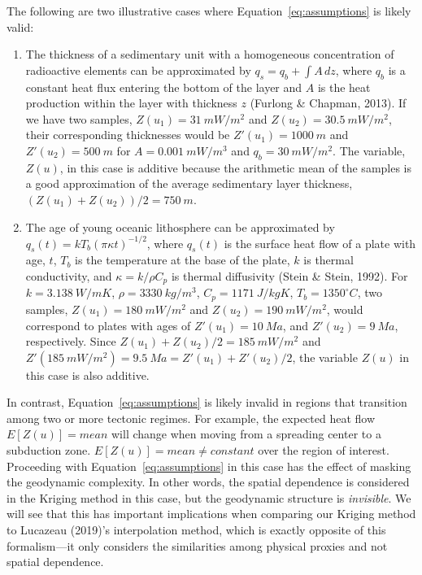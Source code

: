 \documentclass[draft,linenumbers]{agujournal2018}
\begin{document}
The following are two illustrative cases where
Equation~\ref{eq:assumptions} is likely valid:

\begin{enumerate}
\def\labelenumi{\arabic{enumi}.}
\item
  The thickness of a sedimentary unit with a homogeneous concentration
  of radioactive elements can be approximated by
  \(q_s = q_b + \int A \,dz\), where \(q_b\) is a constant heat flux
  entering the bottom of the layer and \(A\) is the heat production
  within the layer with thickness \(z\) (Furlong \& Chapman, 2013). If
  we have two samples, \(Z(u_1) = 31~mW/m^2\) and
  \(Z(u_2) = 30.5~mW/m^2\), their corresponding thicknesses would be
  \(Z'(u_1) = 1000~m\) and \(Z'(u_2) = 500~m\) for \(A = 0.001~mW/m^3\)
  and \(q_b = 30~mW/m^2\). The variable, \(Z(u)\), in this case is
  additive because the arithmetic mean of the samples is a good
  approximation of the average sedimentary layer thickness,
  \((Z(u_1) + Z(u_2)) / 2 = 750~m\).
\item
  The age of young oceanic lithosphere can be approximated by
  \(q_s(t) = kT_b(\pi\kappa t)^{-1/2}\), where \(q_s(t)\) is the surface
  heat flow of a plate with age, \(t\), \(T_b\) is the temperature at
  the base of the plate, \(k\) is thermal conductivity, and
  \(\kappa = k/\rho C_p\) is thermal diffusivity (Stein \& Stein, 1992).
  For \(k = 3.138~W/mK\), \(\rho = 3330~kg/m^3\), \(C_p = 1171~J/kgK\),
  \(T_b = 1350^{\circ}C\), two samples, \(Z(u_1) = 180~mW/m^2\) and
  \(Z(u_2) = 190~mW/m^2\), would correspond to plates with ages of
  \(Z'(u_1) = 10~Ma\), and \(Z'(u_2) = 9~Ma\), respectively. Since
  \(Z(u_1) + Z(u_2) / 2 = 185~mW/m^2\) and
  \(Z'(185~mW/m^2) = 9.5~Ma = Z'(u_1) + Z'(u_2) / 2\), the variable
  \(Z(u)\) in this case is also additive.
\end{enumerate}

In contrast, Equation~\ref{eq:assumptions} is likely invalid in regions
that transition among two or more tectonic regimes. For example, the
expected heat flow \(E[Z(u)] = mean\) will change when moving from a
spreading center to a subduction zone. \(E[Z(u)] = mean \neq constant\)
over the region of interest. Proceeding with
Equation~\ref{eq:assumptions} in this case has the effect of masking the
geodynamic complexity. In other words, the spatial dependence is
considered in the Kriging method in this case, but the geodynamic
structure is \emph{invisible}. We will see that this has important
implications when comparing our Kriging method to Lucazeau (2019)'s
interpolation method, which is exactly opposite of this formalism---it
only considers the similarities among physical proxies and not spatial
dependence.
\end{document}
